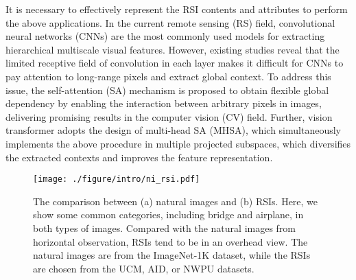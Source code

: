 \documentclass[10pt, journal,twoside]{IEEEtran}
\begin{document}
It is necessary to effectively represent the RSI contents and attributes to perform the above applications. \cite{zyx_1,asr_2021_jstars_f2brbm,zyx_2,ass_2022_tgrs_factseg,NN_TSP_object_detection,zyx_3,acd_2021_jstars_dasnet} In the current remote sensing (RS) field, convolutional neural networks (CNNs) are the most commonly used models for extracting hierarchical multiscale visual features. \cite{xu2021_dfagcn,farseg,acd_2021_grsl_snunet,aod_2022_tgrs_s2anet} However, existing studies \cite{erf,segformer} reveal that the limited receptive field of convolution in each layer makes it difficult for CNNs to pay attention to long-range pixels and extract global context. To address this issue, the self-attention (SA) mechanism \cite{non-local} is proposed to obtain flexible global dependency by enabling the interaction between arbitrary pixels in images, delivering promising results in the computer vision (CV) field. Further, vision transformer \cite{vit} adopts the design of multi-head SA (MHSA), which simultaneously implements the above procedure in multiple projected subspaces, which diversifies the extracted contexts and improves the feature representation.


\begin{figure}[t]
  \centering
  \texttt{[image: ./figure/intro/ni\_rsi.pdf]}\\
  \caption{The comparison between (a) natural images and (b) RSIs. Here, we show some common categories, including bridge and airplane, in both types of images. Compared with the natural images from horizontal observation, RSIs tend to be in an overhead view. The natural images are from the ImageNet-1K dataset, while the RSIs are chosen from the UCM, AID, or NWPU datasets.
  }
  \label{sample_images}
\end{figure}
\end{document}
